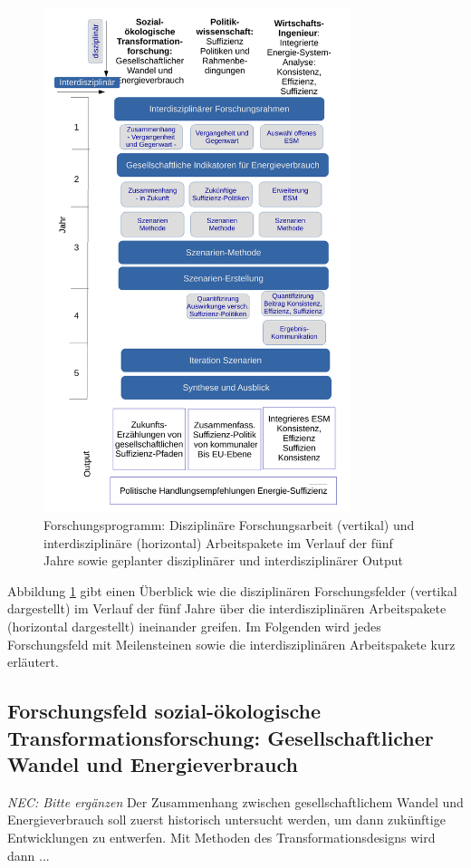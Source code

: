 \documentclass[a4paper,11pt,twoside]{scrartcl}
\begin{document}
\begin{figure}[!h]
    \centering
    \includegraphics[width=0.8\textwidth]{figures/Forschungsarbeit.pdf}
    \caption{Forschungsprogramm: Disziplinäre Forschungsarbeit (vertikal) und  interdisziplinäre (horizontal) Arbeitspakete im Verlauf der fünf Jahre sowie geplanter disziplinärer und interdisziplinärer Output}
    \label{fig:forschungsprogramm}
\end{figure}

Abbildung \ref{fig:forschungsprogramm} gibt einen Überblick wie die disziplinären Forschungsfelder (vertikal dargestellt) im Verlauf der fünf Jahre über die interdisziplinären Arbeitspakete (horizontal dargestellt) ineinander greifen. Im Folgenden wird jedes Forschungsfeld mit Meilensteinen sowie die interdisziplinären Arbeitspakete kurz erläutert.

\subsection*{Forschungsfeld sozial-ökologische Transformationsforschung: Gesellschaftlicher Wandel und Energieverbrauch}
\textit{NEC: Bitte ergänzen}
Der Zusammenhang zwischen gesellschaftlichem Wandel und Energieverbrauch soll zuerst historisch untersucht werden, um dann zukünftige Entwicklungen zu entwerfen. Mit Methoden des Transformationsdesigns wird dann ...
\end{document}
